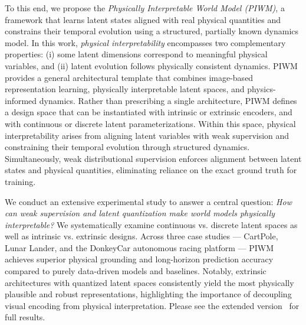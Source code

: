 \documentclass[nonacm,sigconf]{acmart}
\begin{document}
To this end, we propose the \textit{Physically Interpretable World Model (PIWM)}, a framework that learns latent states aligned with real physical quantities and constrains their temporal evolution using a structured, partially known dynamics model. In this work, \emph{physical interpretability} encompasses two complementary properties: (i) some latent dimensions correspond to meaningful physical variables, and (ii) latent evolution follows physically consistent dynamics. PIWM provides a general architectural template that combines image-based representation learning, physically interpretable latent spaces, and physics-informed dynamics.
Rather than prescribing a single architecture, PIWM defines a design space that can be instantiated with intrinsic or extrinsic encoders, and with continuous or discrete latent parameterizations.
Within this space, physical interpretability arises from aligning latent variables with weak supervision and constraining their temporal evolution through structured dynamics. Simultaneously, weak distributional supervision enforces alignment between latent states and physical quantities, eliminating reliance on the exact ground truth for training.

We conduct an extensive experimental study to answer a central question: \emph{How can weak supervision and latent quantization make world models physically interpretable?} We systematically examine continuous vs. discrete latent spaces as well as intrinsic vs. extrinsic designs. Across three case studies --- CartPole, Lunar Lander, and the DonkeyCar autonomous racing platform --- PIWM achieves superior physical grounding and long-horizon prediction accuracy compared to purely data-driven models and baselines. Notably, extrinsic architectures with quantized latent spaces consistently yield the most physically plausible and robust representations, highlighting the importance of decoupling visual encoding from physical interpretation. Please see the extended version~\cite{extended} for full results.
\end{document}
